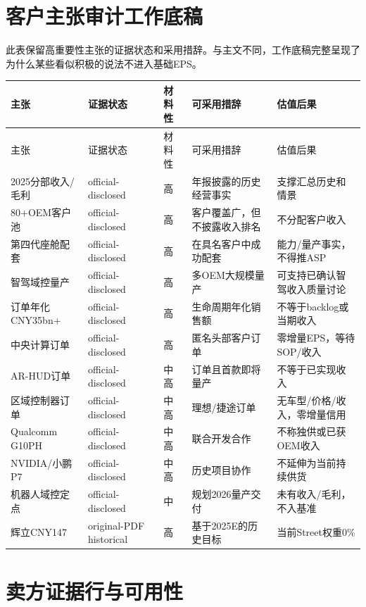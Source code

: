 \renewcommand{\arraystretch}{1.90}
\section{客户主张审计工作底稿}

此表保留高重要性主张的证据状态和采用措辞。与主文不同，工作底稿完整呈现了为什么某些看似积极的说法不进入基础EPS。

\begin{longtable}{L{2.6cm}L{2.6cm}L{2.0cm}L{2.8cm}L{3.0cm}}
\toprule
主张 & 证据状态 & 材料性 & 可采用措辞 & 估值后果 \\
\midrule
\endfirsthead
\toprule
主张 & 证据状态 & 材料性 & 可采用措辞 & 估值后果 \\
\midrule
\endhead
2025分部收入/毛利 & official-disclosed & 高 & 年报披露的历史经营事实 & 支撑汇总历史和情景 \\
80+OEM客户池 & official-disclosed & 高 & 客户覆盖广，但不披露收入排名 & 不分配客户收入 \\
第四代座舱配套 & official-disclosed & 高 & 在具名客户中成功配套 & 能力/量产事实，不得推ASP \\
智驾域控量产 & official-disclosed & 高 & 多OEM大规模量产 & 可支持已确认智驾收入质量讨论 \\
订单年化CNY35bn+ & official-disclosed & 高 & 生命周期年化销售额 & 不等于backlog或当期收入 \\
中央计算订单 & official-disclosed & 高 & 匿名头部客户订单 & 零增量EPS，等待SOP/收入 \\
AR-HUD订单 & official-disclosed & 中高 & 订单且首款即将量产 & 不等于已实现收入 \\
区域控制器订单 & official-disclosed & 中高 & 理想/捷途订单 & 无车型/价格/收入，零增量信用 \\
Qualcomm G10PH & official-disclosed & 中高 & 联合开发合作 & 不称独供或已获OEM收入 \\
NVIDIA/小鹏P7 & official-disclosed & 中高 & 历史项目协作 & 不延伸为当前持续供货 \\
机器人域控定点 & official-disclosed & 中 & 规划2026量产交付 & 未有收入/毛利，不入基准 \\
辉立CNY147 & original-PDF historical & 高 & 基于2025E的历史目标 & 当前Street权重0\% \\
\bottomrule
\end{longtable}

\section{卖方证据行与可用性}

